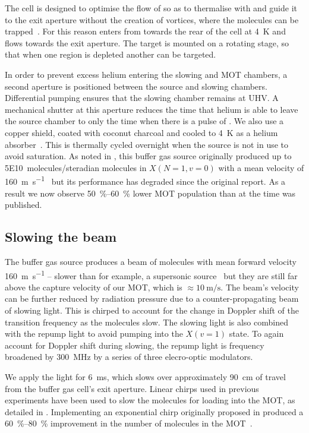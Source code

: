 The cell is designed to optimise the flow of \He{} so as to thermalise with
\CaF{} and guide it to the exit aperture without the creation of vortices,
where the molecules can be trapped~\cite{Truppe2018}. For this reason \He{}
enters from towards the rear of the cell at \SI{4}{\kelvin} and flows towards
the exit aperture.  The \Ca{} target is  mounted on a rotating stage, so that
when one region is depleted another can be targeted.

In order to prevent excess helium entering the slowing and MOT chambers, a
second aperture is positioned between the source and slowing chambers.
Differential pumping ensures that the slowing chamber remains at UHV. A
mechanical shutter at this aperture reduces the time that helium is able to
leave the source chamber to only the time when there is a pulse of \CaF{}. We
also use a copper shield, coated with coconut charcoal and cooled to
\SI{4}{\kelvin} as a helium absorber~\cite{doi:10.1116/1.574141}. This is
thermally cycled overnight when the source is not in use to avoid saturation.
As noted in , this buffer gas source originally
produced up to \SI{5E10}{molecules/steradian} molecules in $X(N=1, v=0)$ with a
mean velocity of \SI{160}{\meter\per\second}~\cite{Truppe2018} but its
performance has degraded since the original report. As a result we now observe
\SIrange{50}{60}{\percent} lower MOT population than at the time
 was published.

\subsection*{Slowing the beam}

The buffer gas source produces a beam of molecules with mean forward velocity
\SI{160}{\meter\per\second} -- slower than for example, a supersonic
source~\cite{Mathavan2016} but they are still far above the capture velocity of
our MOT, which is $\approx\SI{10}{\meter\per\second}$. The beam's velocity can be
further reduced by radiation pressure due to a counter-propagating beam of
 slowing light. This is chirped to account for the change in
Doppler shift of the transition frequency as the molecules slow. The slowing
light is also combined with the  repump light to avoid pumping
into the $X(v=1)$ state. To again account for Doppler shift during slowing, the
repump light is frequency broadened by \SI{300}{\mega\hertz} by a series of
three elecro-optic modulators.

We apply the light for \SI{6}{\milli\second}, which slows over approximately
\SI{90}{\centi\meter} of travel from the buffer gas cell's exit aperture.
Linear chirps used in previous experiments have been used to slow the molecules
for loading into the MOT, as detailed in . Implementing an
exponential chirp originally proposed in   produced a
\SIrange{60}{80}{\percent} improvement in the number of molecules in the
MOT~\cite{Jurgilas2021}.

